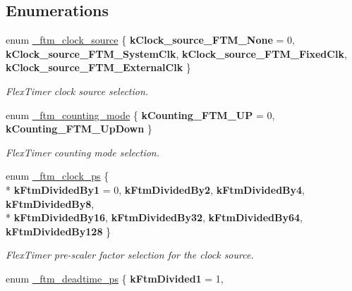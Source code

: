 \subsection*{Enumerations}
\begin{DoxyCompactItemize}
\item 
enum \hyperlink{group__ftm__hal_ga1631aa75184432b61dce335e3ea19c82}{\+\_\+ftm\+\_\+clock\+\_\+source} \{ {\bfseries k\+Clock\+\_\+source\+\_\+\+F\+T\+M\+\_\+\+None} = 0, 
{\bfseries k\+Clock\+\_\+source\+\_\+\+F\+T\+M\+\_\+\+System\+Clk}, 
{\bfseries k\+Clock\+\_\+source\+\_\+\+F\+T\+M\+\_\+\+Fixed\+Clk}, 
{\bfseries k\+Clock\+\_\+source\+\_\+\+F\+T\+M\+\_\+\+External\+Clk}
 \}\hypertarget{group__ftm__hal_ga1631aa75184432b61dce335e3ea19c82}{}\label{group__ftm__hal_ga1631aa75184432b61dce335e3ea19c82}
\begin{DoxyCompactList}\small\item\em Flex\+Timer clock source selection. \end{DoxyCompactList}
\item 
enum \hyperlink{group__ftm__hal_ga5c364e9561194510179ee19d0988a45f}{\+\_\+ftm\+\_\+counting\+\_\+mode} \{ {\bfseries k\+Counting\+\_\+\+F\+T\+M\+\_\+\+UP} = 0, 
{\bfseries k\+Counting\+\_\+\+F\+T\+M\+\_\+\+Up\+Down}
 \}\hypertarget{group__ftm__hal_ga5c364e9561194510179ee19d0988a45f}{}\label{group__ftm__hal_ga5c364e9561194510179ee19d0988a45f}
\begin{DoxyCompactList}\small\item\em Flex\+Timer counting mode selection. \end{DoxyCompactList}
\item 
enum \hyperlink{group__ftm__hal_gaf2d69ea78d9db386313850f9ab25e30a}{\+\_\+ftm\+\_\+clock\+\_\+ps} \{ \\*
{\bfseries k\+Ftm\+Divided\+By1} = 0, 
{\bfseries k\+Ftm\+Divided\+By2}, 
{\bfseries k\+Ftm\+Divided\+By4}, 
{\bfseries k\+Ftm\+Divided\+By8}, 
\\*
{\bfseries k\+Ftm\+Divided\+By16}, 
{\bfseries k\+Ftm\+Divided\+By32}, 
{\bfseries k\+Ftm\+Divided\+By64}, 
{\bfseries k\+Ftm\+Divided\+By128}
 \}\hypertarget{group__ftm__hal_gaf2d69ea78d9db386313850f9ab25e30a}{}\label{group__ftm__hal_gaf2d69ea78d9db386313850f9ab25e30a}
\begin{DoxyCompactList}\small\item\em Flex\+Timer pre-\/scaler factor selection for the clock source. \end{DoxyCompactList}
\item 
enum \hyperlink{group__ftm__hal_gad9f0fd5973baa099b25d10bf325c572d}{\+\_\+ftm\+\_\+deadtime\+\_\+ps} \{ {\bfseries k\+Ftm\+Divided1} = 1, 

\end{DoxyCompactItemize}
